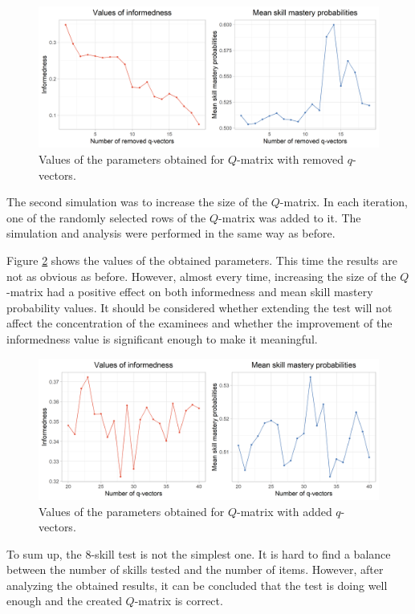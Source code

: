\documentclass[english]{pwr_wmat_praca_dyplomowa}
\theoremstyle{plain}
\theoremstyle{definition}
\numberwithin{theorem}{chapter}
\begin{document}
\begin{figure}[h!]
	\centering
	\includegraphics[width=\textwidth]{Smaller_qmatrix_results1.png}
	\caption{Values of the parameters obtained for $Q$-matrix with removed $q$-vectors.}
	\label{smaller_qmat}
\end{figure}

The second simulation was to increase the size of the $Q$-matrix. In each iteration, one of the randomly selected rows of the $Q$-matrix was added to it. The simulation and analysis were performed in the same way as before. 

Figure \ref{bigger_qmat} shows the values of the obtained parameters. This time the results are not as obvious as before. However, almost every time, increasing the size of the $Q$-matrix had a positive effect on both informedness and mean skill mastery probability values. It should be considered whether extending the test will not affect the concentration of the examinees and whether the improvement of the informedness value is significant enough to make it meaningful.

\begin{figure}[h!]
	\centering
	\includegraphics[width=\textwidth]{Bigger_qmatrix_results1.png}
	\caption{Values of the parameters obtained for $Q$-matrix with added $q$-vectors.}
	\label{bigger_qmat}
\end{figure}

To sum up, the 8-skill test is not the simplest one. It is hard to find a balance between the number of skills tested and the number of items. However, after analyzing the obtained results, it can be concluded that the test is doing well enough and the created $Q$-matrix is correct.
\end{document}
